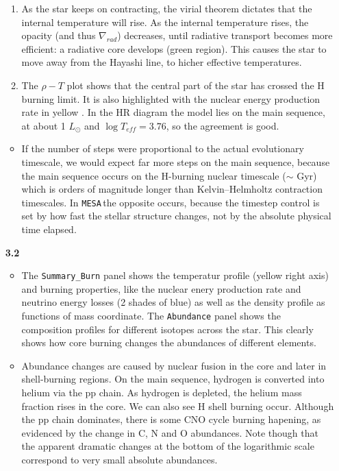 \documentclass[11pt,a4paper]{article}
\newcommand{\MESA}{\texttt{MESA}\,}
\begin{document}
\begin{enumerate}
\begin{itemize}
\end{itemize}
\begin{enumerate}

\item As the star keeps on contracting, the virial theorem dictates that the internal temperature will rise. 
As the internal temperature rises, the opacity (and thus $\nabla_{rad}$) decreases, until radiative transport becomes more efficient: a radiative core develops (green region). This causes the star to move away from the Hayashi line, to hicher effective temperatures. 


\item
The $\rho-T$ plot shows that  the central part of the star has crossed the H burning limit. It is also highlighted with the nuclear energy production rate in yellow . 
In the HR diagram the model lies on the main sequence, at about 1 $L_\odot$ and $\log T_{eff} = 3.76$, so the agreement is good. 

\end{enumerate}
\begin{itemize}
\item If the number of steps were proportional to the actual evolutionary timescale, we would expect far more steps on the main sequence, because the main sequence occurs on the H-burning nuclear timescale ($\sim$ Gyr) which is orders of magnitude longer than Kelvin–Helmholtz contraction timescales. In \MESA the opposite occurs, because the timestep control is set by how fast the stellar structure changes, not by the absolute physical time elapsed.
\end{itemize}


\item[\bf{3.2}] 
\begin{itemize}
\item The \texttt{Summary\_Burn} panel shows the temperatur profile (yellow right axis) and burning properties, like the nuclear enery production rate and neutrino energy losses (2 shades of blue) as well as the density profile as functions of mass coordinate.
 The \texttt{Abundance} panel shows the composition profiles for different isotopes across the star. This clearly shows how core burning changes the abundances of different elements. 


\item Abundance changes are caused by nuclear fusion in the core and later in shell-burning regions. On the main sequence, hydrogen is converted into helium via the pp chain. As hydrogen is depleted, the helium mass fraction rises in the core. 
We can also see H shell burning occur. Although the pp chain dominates, there is some CNO cycle burning hapening, as evidenced by the change in C, N and O abundances. Note though that the apparent dramatic changes at the bottom of the logarithmic scale correspond to very small absolute abundances.
\end{itemize}


\end{enumerate}
\end{document}
